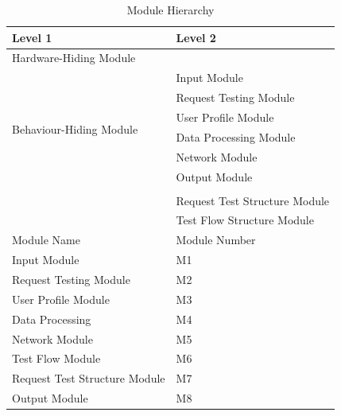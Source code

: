 \documentclass[12pt, titlepage]{article}
\begin{document}
\begin{table}[h!]
\centering
\begin{tabular}{p{} p{}}
\toprule
\textbf{Level 1} & \textbf{Level 2}\\
\midrule

{Hardware-Hiding Module} & ~ \\
\midrule

\multirow{7}{0.3\textwidth}{Behaviour-Hiding Module}
& Input Module\\
& Request Testing Module\\
& User Profile Module\\
& Data Processing Module\\
& Network Module\\
& Output Module\\
\midrule

\multirow{3}{0.3\textwidth}{Software Decision Module}\\
& Request Test Structure Module\\
& Test Flow Structure Module\\
\midrule
{Module Name} & {Module Number}\\
\midrule
Input Module & M1\\
Request Testing Module & M2\\
User Profile Module & M3\\
Data Processing & M4\\
Network Module & M5\\
Test Flow Module & M6\\
Request Test Structure Module & M7\\
Output Module & M8\\
\bottomrule

\end{tabular}
\caption{Module Hierarchy}
\label{TblMH}
\end{table}
\newpage

\end{document}
